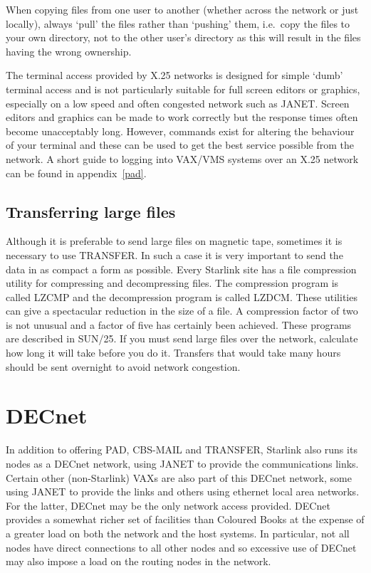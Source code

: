 When copying files from one user to another (whether across the network or just
locally), always `pull' the files rather than `pushing' them, i.e.\ copy the
files to your own directory, not to the other user's directory as this will
result in the files having the wrong ownership.

The terminal access provided by X.25 networks is designed for simple `dumb'
terminal access and is not particularly suitable for full screen editors or
graphics, especially on a low speed and often congested network such as JANET.
Screen editors and graphics can be made to work correctly but the response times
often become unacceptably long.
However, commands exist for altering the behaviour of your terminal and these
can be used to get the best service possible from the network.
A short guide to logging into VAX/VMS systems over an X.25 network can be found
in appendix~\ref{pad}.

\subsection{Transferring large files}
Although it is preferable to send large files on magnetic tape, sometimes it
is necessary to use TRANSFER. In such a case it is very important to send the
data in as compact a form as possible. Every Starlink site has a file
compression utility for compressing and decompressing files. The
compression program is called LZCMP and the decompression program is called
LZDCM. These utilities can give a spectacular reduction in the size of a
file. A compression factor of two is not unusual and a factor of five has
certainly been achieved. These programs are described in SUN/25. If you must
send large files over the network, calculate how long it will take before you
do it. Transfers that would take many hours should be sent overnight to avoid
network congestion.

\section{DECnet}

In addition to offering PAD, CBS-MAIL and TRANSFER, Starlink also runs its
nodes as a DECnet network, using JANET to provide the communications links.
Certain other (non-Starlink) VAXs are also part of this DECnet network, some
using JANET to provide the links and others using ethernet local area networks.
For the latter, DECnet may be the only network access provided. DECnet provides
a somewhat richer set of facilities than Coloured Books at the expense of a
greater load on both the network and the host systems. In particular, not all
nodes have direct connections to all other nodes and so excessive use of DECnet
may also impose a load on the routing nodes in the network.

